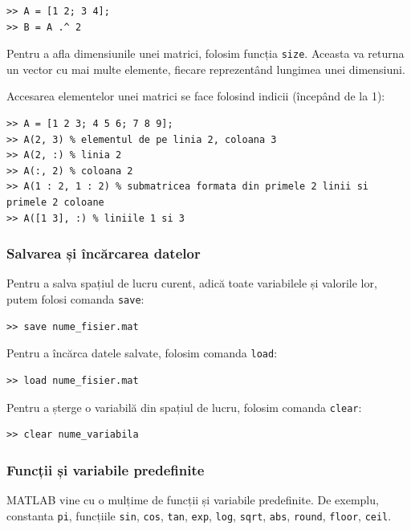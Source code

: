 \documentclass{exam}
\begin{document}
\begin{lstlisting}
>> A = [1 2; 3 4];
>> B = A .^ 2
\end{lstlisting}

\par Pentru a afla dimensiunile unei matrici, folosim funcția \verb|size|. Aceasta
va returna un vector cu mai multe elemente, fiecare reprezentând lungimea unei
dimensiuni.

\par Accesarea elementelor unei matrici se face folosind indicii (începând de la 1):

\begin{lstlisting}
>> A = [1 2 3; 4 5 6; 7 8 9];
>> A(2, 3) % elementul de pe linia 2, coloana 3
>> A(2, :) % linia 2
>> A(:, 2) % coloana 2
>> A(1 : 2, 1 : 2) % submatricea formata din primele 2 linii si primele 2 coloane
>> A([1 3], :) % liniile 1 si 3
\end{lstlisting}

\subsubsection{Salvarea și încărcarea datelor}

\par Pentru a salva spațiul de lucru curent, adică toate variabilele și
valorile lor, putem folosi comanda \verb|save|:

\begin{lstlisting}
>> save nume_fisier.mat
\end{lstlisting}

\par Pentru a încărca datele salvate, folosim comanda \verb|load|:

\begin{lstlisting}
>> load nume_fisier.mat
\end{lstlisting}

\par Pentru a șterge o variabilă din spațiul de lucru, folosim comanda
\verb|clear|:

\begin{lstlisting}
>> clear nume_variabila
\end{lstlisting}

\subsubsection{Funcții și variabile predefinite}

\par MATLAB vine cu o mulțime de funcții și variabile predefinite. De exemplu,
constanta \verb|pi|, funcțiile \verb|sin|, \verb|cos|, \verb|tan|, \verb|exp|,
\verb|log|, \verb|sqrt|, \verb|abs|, \verb|round|, \verb|floor|, \verb|ceil|.
\end{document}
